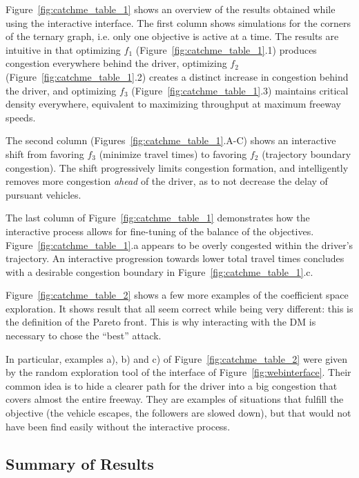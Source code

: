 Figure~\ref{fig:catchme_table_1} shows an overview of the results obtained while using the interactive interface. The first column shows simulations for the corners of the ternary graph, i.e. only one objective is active at a time. The results are intuitive in that optimizing $f_1$ (Figure~\ref{fig:catchme_table_1}.1) produces congestion everywhere behind the driver, optimizing $f_2$ (Figure~\ref{fig:catchme_table_1}.2) creates a distinct increase in congestion behind the driver, and optimizing $f_3$ (Figure~\ref{fig:catchme_table_1}.3) maintains critical density everywhere, equivalent to maximizing throughput at maximum freeway speeds.

The second column (Figures~\ref{fig:catchme_table_1}.A-C) shows an interactive shift from favoring $f_3$ (minimize travel times) to favoring $f_2$ (trajectory boundary congestion). The shift progressively limits congestion formation, and intelligently removes more congestion \emph{ahead} of the driver, as to not decrease the delay of pursuant vehicles.

The last column of Figure~\ref{fig:catchme_table_1} demonstrates how the interactive process allows for fine-tuning of the balance of the objectives. Figure~\ref{fig:catchme_table_1}.a appears to be overly congested within the driver's trajectory. An interactive progression towards lower total travel times concludes with a desirable congestion boundary in Figure~\ref{fig:catchme_table_1}.c.

Figure~\ref{fig:catchme_table_2} shows a few more examples of the coefficient space exploration. It shows result that all seem correct while being very different: this is the definition of the Pareto front. This is why interacting with the DM is necessary to chose the ``best'' attack.

In particular, examples a), b) and c) of Figure~\ref{fig:catchme_table_2} were given by the random exploration tool of the interface of Figure~\ref{fig:webinterface}. Their common idea is to hide a clearer path for the driver into a big congestion that covers almost the entire freeway. They are examples of situations that fulfill the objective (the vehicle escapes, the followers are slowed down), but that would not have been find easily without the interactive process.

\subsection{Summary of Results}

